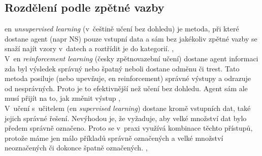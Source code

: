 \documentclass[12pt]{report}			%
\begin{document}
	\subsection{Rozdělení podle zpětné vazby}
	\label{sec:AI-deleni}
	\Gls{en} \emph{unsupervised learning} (v~češtině učení bez dohledu) je metoda, při které dostane agent (\gls{napr} \gls{NS}) pouze vstupní data a sám bez jakékoliv zpětné vazby se snaží najít vzory v~datech a roztřídit je do kategorií. \parencite[\gls{s} 694-695]{AIAMA}, \parencite[\gls{str} 52]{NN_introduction-Kriessel}\\
	V~\gls{en} \emph{reinforcement learning} (česky zpětnovazební učení) dostane agent informaci zda byl výsledek správný nebo špatný neboli dostane odměnu či trest. Tato metoda posiluje (nebo upevňuje, \gls{en} reinforcement) správné výstupy  a odrazuje od nesprávných. Proto je to efektivnější než učení bez dohledu. Agent sám ale musí přijít na to, jak změnit výstup \parencite[\gls{s} 695]{AIAMA}, \parencite[\gls{str} 53]{NN_introduction-Kriessel}\\
	V~učení s~učitelem (\gls{en} \emph{supervised learning}) dostane kromě vstupních dat, také jejich správné řešení. Nevýhodou je, že vyžaduje, aby velké množství dat bylo předem správně označeno. Proto se v~praxi využívá kombinace těchto přístupů, protože máme jen málo příkladů správně označených a velké množství neoznačených či dokonce špatně označených. \parencite[\gls{s} 695]{AIAMA}, \parencite[\gls{str} 53]{NN_introduction-Kriessel}\\
	
\end{document}
